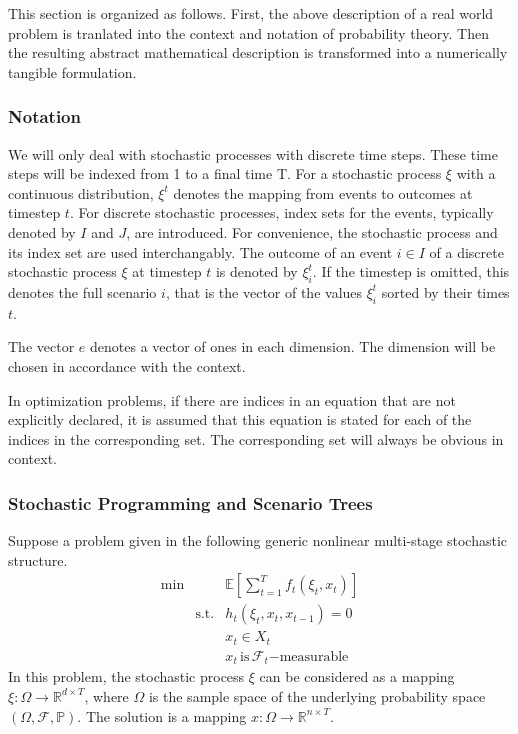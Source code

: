 \documentclass[a4paper, 12pt] {article}
\begin{document}
This section is organized as follows. First, the above description of a real world problem is tranlated into the context and notation of probability theory. Then the resulting abstract mathematical description is transformed into a numerically tangible formulation.
\subsubsection{Notation}
We will only deal with stochastic processes with discrete time steps. These time steps will be indexed from 1 to a final time T. For a stochastic process $\xi$ with a continuous distribution, $\xi^t$ denotes the mapping from events to outcomes at timestep $t$. For discrete stochastic processes, index sets for the events, typically denoted by $I$ and $J$, are introduced. For convenience, the stochastic process and its index set are used interchangably. The outcome of an event $i\in I$ of a discrete stochastic process $\xi$ at timestep $t$ is denoted by $\xi_i^t$. If the timestep is omitted, this denotes the full scenario $i$, that is the vector of the values $\xi_i^t$ sorted by their times $t$.

The vector $e$ denotes a vector of ones in each dimension. The dimension will be chosen in accordance with the context. 

In optimization problems, if there are indices in an equation that are not explicitly declared, it is assumed that this equation is stated for each of the indices in the corresponding set.
The corresponding set will always be obvious in context.
\subsubsection{Stochastic Programming and Scenario Trees}
Suppose a problem given in the following generic nonlinear multi-stage stochastic structure. 
\begin{eqnarray}
  \label{eq:genericSP}
  \min &&\mathbb{E}\left[\sum_{t=1}^Tf_t(\xi_t, x_t)\right]\\
  &\mathrm{s.t.}& h_t(\xi_t, x_t, x_{t-1}) = 0\\
  &&x_t \in X_t\\
  &&x_t \, \mathrm{is}\,\mathcal{F}_t \mathrm{-measurable} \label{eqn:measurability-constraint}
\end{eqnarray}
In this problem, the stochastic process $\xi$ can be considered as a mapping $\xi:\Omega\rightarrow \mathbb{R}^{d\times T}$, where $\Omega$ is the sample space of the underlying probability space $(\Omega, \mathcal{F}, \mathbb{P})$. The solution is a mapping $x:\Omega\rightarrow \mathbb{R}^{n\times T}$.
 
\end{document}
